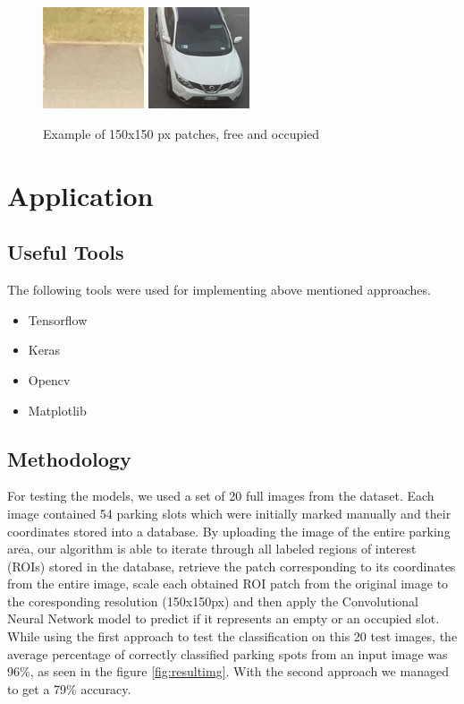 \documentclass[runningheads,a4paper,11pt]{report}
\begin{document}
\begin{figure}[htbp]
	\centerline{\includegraphics[width=3cm]{images/20150703_0810_10} \includegraphics[width=3cm]{images/20150703_0810_45}}   
	\caption{Example of 150x150 px patches, free and occupied}
	\label{fig:patchesimg}
\end{figure}

\chapter{Application}
\label{chapter:application}

\section{Useful Tools}
\label{section:usefultools}
The following tools were used for implementing above mentioned approaches.
\begin{itemize}
  \item Tensorflow
  \item Keras
  \item Opencv
  \item Matplotlib
\end{itemize}


\section{Methodology}
\label{section:methodology}

For testing the models, we used a set of 20 full images from the \cite{cnrpark} dataset.
Each image contained 54 parking slots which were initially marked manually and their coordinates stored into a database. By uploading the image of the entire parking area,
our algorithm is able to iterate through all labeled regions of interest (ROIs) stored in the database, retrieve the patch corresponding to its coordinates from the entire image,
scale each obtained ROI patch from the original image to the coresponding resolution (150x150px)
and then apply the Convolutional Neural Network model to predict if it represents an empty or an occupied slot.
While using the first approach to test the classification on this 20 test images, the average percentage of correctly classified parking spots from an input image was 96\%, as seen in the figure \ref{fig:resultimg}.
With the second approach we managed to get a 79\% accuracy. 
\end{document}
